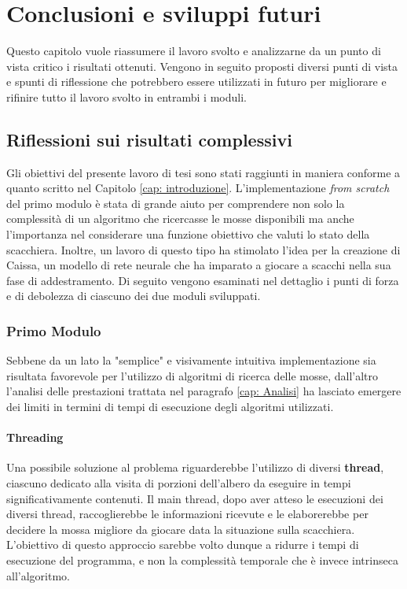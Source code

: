 \chapter{Conclusioni e sviluppi futuri} %
%


\begin{citazione}
    Questo capitolo vuole riassumere il lavoro svolto e analizzarne da un punto di vista critico i risultati ottenuti. Vengono in seguito proposti diversi punti di vista e spunti di riflessione che potrebbero essere utilizzati in futuro per migliorare e rifinire tutto il lavoro svolto in entrambi i moduli.
\end{citazione}

\section{Riflessioni sui risultati complessivi}
Gli obiettivi del presente lavoro di tesi sono stati raggiunti in maniera conforme a quanto scritto nel Capitolo \ref{cap: introduzione}. L'implementazione \textit{from scratch} del primo modulo è stata di grande aiuto per comprendere non solo la complessità di un algoritmo che ricercasse le mosse disponibili ma anche l'importanza nel considerare una funzione obiettivo che valuti lo stato della scacchiera. Inoltre, un lavoro di questo tipo ha stimolato l'idea per la creazione di Caissa, un modello di rete neurale che ha imparato a giocare a scacchi nella sua fase di addestramento. Di seguito vengono esaminati nel dettaglio i punti di forza e di debolezza di ciascuno dei due moduli sviluppati.
\subsection{Primo Modulo}
Sebbene da un lato la "semplice" e visivamente intuitiva implementazione sia risultata favorevole per l'utilizzo di algoritmi di ricerca delle mosse, dall'altro l'analisi delle prestazioni trattata nel paragrafo \ref{cap: Analisi} ha lasciato emergere dei limiti in termini di tempi di esecuzione degli algoritmi utilizzati. 
\subsubsection{Threading}
Una possibile soluzione al problema riguarderebbe l'utilizzo di diversi \textbf{thread}, ciascuno dedicato alla visita di porzioni dell'albero da eseguire in tempi significativamente contenuti. Il main thread, dopo aver atteso le esecuzioni dei diversi thread, raccoglierebbe le informazioni ricevute e le elaborerebbe per decidere la mossa migliore da giocare data la situazione sulla scacchiera. L'obiettivo di questo approccio sarebbe volto dunque a ridurre i tempi di esecuzione del programma, e non la complessità temporale che è invece intrinseca all'algoritmo.

